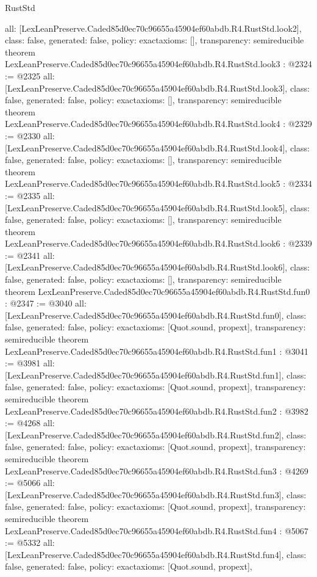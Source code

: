 \begin{lexlean}{RustStd}
\begin{coremodule}
{  all: [LexLeanPreserve.Caded85d0ec70c96655a45904ef60abdb.R4.RustStd.look2],
  class: false,
  generated: false,
  policy: exact{axioms: []},
  transparency: semireducible
}
theorem LexLeanPreserve.Caded85d0ec70c96655a45904ef60abdb.R4.RustStd.look3 : @2324 := @2325 {
  all: [LexLeanPreserve.Caded85d0ec70c96655a45904ef60abdb.R4.RustStd.look3],
  class: false,
  generated: false,
  policy: exact{axioms: []},
  transparency: semireducible
}
theorem LexLeanPreserve.Caded85d0ec70c96655a45904ef60abdb.R4.RustStd.look4 : @2329 := @2330 {
  all: [LexLeanPreserve.Caded85d0ec70c96655a45904ef60abdb.R4.RustStd.look4],
  class: false,
  generated: false,
  policy: exact{axioms: []},
  transparency: semireducible
}
theorem LexLeanPreserve.Caded85d0ec70c96655a45904ef60abdb.R4.RustStd.look5 : @2334 := @2335 {
  all: [LexLeanPreserve.Caded85d0ec70c96655a45904ef60abdb.R4.RustStd.look5],
  class: false,
  generated: false,
  policy: exact{axioms: []},
  transparency: semireducible
}
theorem LexLeanPreserve.Caded85d0ec70c96655a45904ef60abdb.R4.RustStd.look6 : @2339 := @2341 {
  all: [LexLeanPreserve.Caded85d0ec70c96655a45904ef60abdb.R4.RustStd.look6],
  class: false,
  generated: false,
  policy: exact{axioms: []},
  transparency: semireducible
}
theorem LexLeanPreserve.Caded85d0ec70c96655a45904ef60abdb.R4.RustStd.fun0 : @2347 := @3040 {
  all: [LexLeanPreserve.Caded85d0ec70c96655a45904ef60abdb.R4.RustStd.fun0],
  class: false,
  generated: false,
  policy: exact{axioms: [Quot.sound, propext]},
  transparency: semireducible
}
theorem LexLeanPreserve.Caded85d0ec70c96655a45904ef60abdb.R4.RustStd.fun1 : @3041 := @3981 {
  all: [LexLeanPreserve.Caded85d0ec70c96655a45904ef60abdb.R4.RustStd.fun1],
  class: false,
  generated: false,
  policy: exact{axioms: [Quot.sound, propext]},
  transparency: semireducible
}
theorem LexLeanPreserve.Caded85d0ec70c96655a45904ef60abdb.R4.RustStd.fun2 : @3982 := @4268 {
  all: [LexLeanPreserve.Caded85d0ec70c96655a45904ef60abdb.R4.RustStd.fun2],
  class: false,
  generated: false,
  policy: exact{axioms: [Quot.sound, propext]},
  transparency: semireducible
}
theorem LexLeanPreserve.Caded85d0ec70c96655a45904ef60abdb.R4.RustStd.fun3 : @4269 := @5066 {
  all: [LexLeanPreserve.Caded85d0ec70c96655a45904ef60abdb.R4.RustStd.fun3],
  class: false,
  generated: false,
  policy: exact{axioms: [Quot.sound, propext]},
  transparency: semireducible
}
theorem LexLeanPreserve.Caded85d0ec70c96655a45904ef60abdb.R4.RustStd.fun4 : @5067 := @5332 {
  all: [LexLeanPreserve.Caded85d0ec70c96655a45904ef60abdb.R4.RustStd.fun4],
  class: false,
  generated: false,
  policy: exact{axioms: [Quot.sound, propext]},
}
\end{coremodule}
\end{lexlean}
